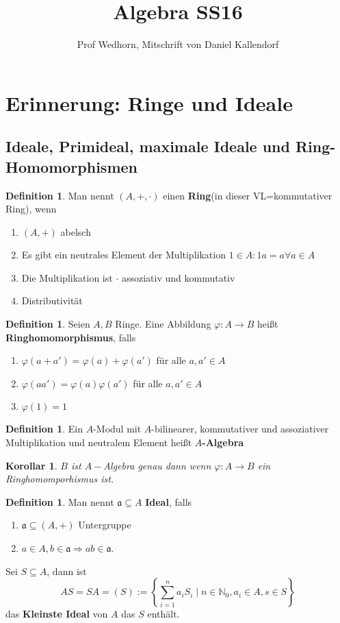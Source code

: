 \documentclass[10pt,a4paper]{article}
\author{Prof Wedhorn, Mitschrift von Daniel Kallendorf}
\title{Algebra SS16}
\newcommand{\N}{\ensuremath{\mathbb{N}}}
\newcounter{thm}[section]
\theoremstyle{definition}
\newtheorem{definition}[thm]{Definition}
\theoremstyle{plain}
\newtheorem{kor}[thm]{Korollar}
\theoremstyle{remark}
\begin{document}
\maketitle
\tableofcontents


\section{Erinnerung: Ringe und Ideale}
\subsection{Ideale, Primideal, maximale Ideale und Ring-Homomorphismen}
\setcounter{thm}{-10}
	\begin{definition}
		Man nennt $(A,+,\cdot)$ einen \textbf{Ring}(in dieser VL=kommutativer Ring), wenn
		\begin{enumerate}
			\item $(A,+)$ abelsch
			\item Es gibt ein neutrales Element der Multiplikation $1\in A:1a=a\forall a\in A$
			\item Die Multiplikation ist $\cdot$ assoziativ und kommutativ
			\item Distributivität
		\end{enumerate}
	\end{definition}
	\begin{definition}
		Seien $A,B$ Ringe. Eine Abbildung $\varphi:A\rightarrow B$ heißt \textbf{Ringhomomorphismus}, falls
		\begin{enumerate}
			\item $\varphi(a+a')=\varphi(a)+\varphi(a')$ für alle $a,a'\in A$
			\item $\varphi(aa')=\varphi(a)\varphi(a')$ für alle $a,a'\in A$
			\item $\varphi(1)=1$
		\end{enumerate}
	\end{definition}
	\begin{definition}
		Ein $A$-Modul mit $A$-bilinearer, kommutativer und assoziativer Multiplikation und neutralem Element heißt \textbf{$A$-Algebra}
	\end{definition}
	\begin{kor}
		$B$ ist $A-$Algebra genau dann wenn $\varphi:A\rightarrow B$ ein Ringhomomporhismus ist.
	\end{kor}
\begin{definition}
	Man nennt $\mathfrak a\subseteq A$ \textbf{Ideal}, falls
	\begin{enumerate}
		\item $\mathfrak a\subseteq (A,+)$ Untergruppe
		\item $a\in A,b\in\mathfrak a\Rightarrow ab\in\mathfrak a$.
	\end{enumerate}
	Sei $S\subseteq A$, dann ist
	\[AS=SA=(S):=\left\{\sum_{i=1}^{n}a_iS_i\mid n\in\N_0,a_i\in A,s\in S\right\}\]
	das \textbf{Kleinste Ideal} von $A$ das $S$ enthält.
\end{definition}
\end{document}
